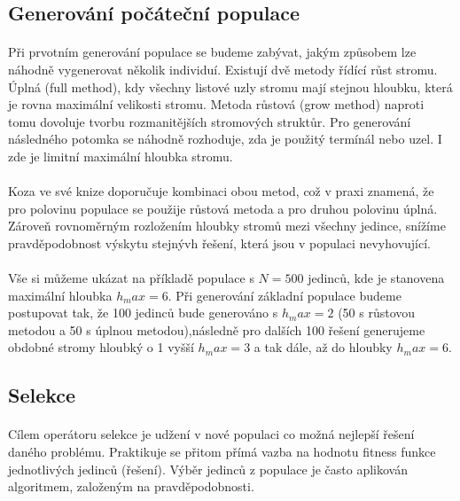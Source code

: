 \documentclass[bc,male,java,dept460]{diploma}		%
\begin{document}

\subsection{Generování počáteční populace}
\paragraph*{}
Při prvotním generování populace se budeme zabývat, jakým způsobem lze náhodně vygenerovat několik individuí. Existují dvě metody řídící růst stromu. Úplná (full method), kdy všechny listové uzly stromu mají stejnou hloubku, která je rovna maximální velikosti stromu. Metoda růstová (grow method) naproti tomu dovoluje tvorbu rozmanitějších stromových struktůr. Pro generování následného potomka se náhodně rozhoduje, zda je použitý termínál nebo uzel. I zde je limitní maximální hloubka stromu.

\paragraph*{}
Koza ve své knize \cite{kozagp} doporučuje kombinaci obou metod, což v praxi znamená, že pro polovinu populace se použije růstová metoda a pro druhou polovinu úplná. Zároveň rovnoměrným rozložením hloubky stromů mezi všechny jedince, snížíme pravděpodobnost výskytu stejnývh řešení, která jsou v populaci nevyhovující. 

\paragraph*{}
Vše si můžeme ukázat na příkladě populace s $N=500$ jedinců, kde je stanovena maximální hloubka $h_max=6$. Při generování základní populace budeme postupovat tak, že 100 jedinců bude generováno s $h_max=2$ (50 s růstovou metodou a 50 s úplnou metodou),následně pro dalších 100 řešení generujeme obdobné stromy hloubký o 1 vyšší $h_max=3$ a tak dále, až do hloubky $h_max=6$.

\subsection{Selekce}
\paragraph*{}
Cílem operátoru selekce je udžení v nové populaci co možná nejlepší řešení daného problému. Praktikuje se přitom přímá vazba na hodnotu fitness funkce jednotlivých jedinců (řešení). Výběr jedinců z populace je často aplikován  algoritmem, založeným na pravděpodobnosti.
\end{document}
